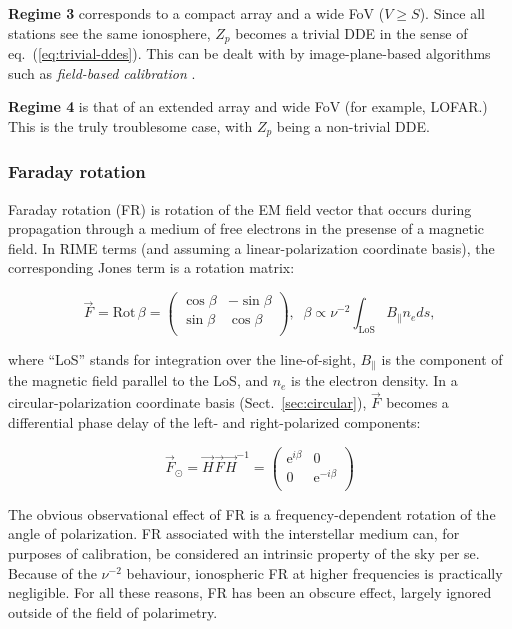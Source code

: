 \documentclass[]{aa}
\newcommand{\matrixtt}[4]{\left( \begin{array}{cc}#1&#2\\#3&#4\\\end{array} \right)}
\newcommand{\jones}[2]{\vec {#1}_{#2}}
\newcommand{\jonesinv}[2]{\vec {#1}^{-1}_{#2}}
\begin{document}
{\bf Regime 3} corresponds to a compact array and a wide FoV ($V\ge S$). Since all stations see the same ionosphere, $Z_p$ becomes a trivial DDE in the sense of eq.~(\ref{eq:trivial-ddes}). This can be dealt with by image-plane-based algorithms such as \emph{field-based calibration} \citep{Cotton:FBC}.

{\bf Regime 4} is that of an extended array and wide FoV (for example, LOFAR.) This is the truly troublesome case, with $Z_p$ being a non-trivial DDE.

\subsubsection{Faraday rotation\label{sec:DFR}\label{sec:FR}}

Faraday rotation (FR) is rotation of the EM field vector that occurs during propagation through a medium of free electrons in the presense of a magnetic field. In RIME terms (and assuming a linear-polarization coordinate basis), the corresponding Jones term is a rotation matrix:

\begin{equation}\label{eq:FR}
\jones{F}{} = \mathrm{Rot}\,\beta = \matrixtt{\cos\beta}{-\sin\beta}{\sin\beta}{\cos\beta}, \;\;
\beta \propto \nu^{-2} \int_\mathrm{LoS} B_{\parallel} n_e ds,
\end{equation}

where ``LoS'' stands for integration over the line-of-sight, $B_{\parallel}$ is the component of the magnetic field parallel to the LoS, and $n_e$ is the electron density. In a circular-polarization coordinate basis (Sect.~\ref{sec:circular}), $\jones{F}{}$ becomes a differential phase delay of the left- and right-polarized components:

\[
\jones{F}{\odot} = \jones{H}{}\jones{F}{}\jonesinv{H}{} = \matrixtt{\mathrm{e}^{i\beta}}{0}{0}{\mathrm{e}^{-i\beta}}
\]

The obvious observational effect of FR is a frequency-dependent rotation of the angle of polarization. FR associated with the interstellar medium can, for purposes of calibration, be considered an intrinsic property of the sky per se. Because of the $\nu^{-2}$ behaviour, ionospheric FR at higher frequencies is practically negligible. For all these reasons, FR has been an obscure effect, largely ignored outside of the field of polarimetry.
\end{document}
